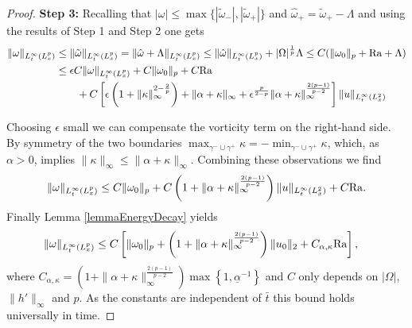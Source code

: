 \documentclass{article}
\theoremstyle{definition}
\theoremstyle{definition}
\newcommand{\Ra}{{\rm{Ra}}}
\begin{document}
\begin{proof}
\medskip
\textbf{Step 3:}
Recalling that $|\omega|\leq \max \lbrace |\tilde \omega_-|,|\tilde \omega_+|\rbrace$ and $\hat\omega_+ =\tilde \omega_+ - \Lambda$ and using the results of Step 1 and Step 2 one gets
\begin{align*}
        \|\omega\|_{L_t^\infty (L_x^p)} &\leq\|\tilde \omega\|_{L_t^\infty(L_x^p)} =\|\hat \omega+\Lambda\|_{L_t^\infty(L_x^p)}
        \leq  \|\hat\omega\|_{L_t^\infty(L_x^p)} + |\Omega|^\frac{1}{p} \Lambda
        \leq C(  \|\omega_0\|_p + \Ra +\Lambda)
        \\
        &\leq \epsilon C \|\omega\|_{L_t^\infty ( L_x^p)} + C\|\omega_0\|_p + C \Ra 
        \\
        &\qquad+ C\left[\epsilon\left(1+\|\kappa\|_\infty^{2-\frac{2}{p}}\right)+\|\alpha+\kappa\|_\infty+\epsilon^{\frac{p}{2-p}} \|\alpha+\kappa\|_\infty^{\frac{2(p-1)}{p-2}}\right] \|u\|_{L^\infty_t (L^2_x)}
\end{align*}
    
Choosing $\epsilon$ small we can compensate the vorticity term on the right-hand side. By symmetry of the two boundaries $\max_{\gamma^-\cup\gamma^+} \kappa=-\min_{\gamma^-\cup\gamma^+} \kappa$, which, as $\alpha>0$, implies $\|\kappa\|_\infty\leq \|\alpha+\kappa\|_\infty$. Combining these observations we find
\begin{align*}
    \|\omega\|_{L_t^\infty(L_x^p)} \leq C \|\omega_0\|_p + C\left(1+\|\alpha+\kappa\|_\infty^{\frac{2(p-1)}{p-2}}\right)\|u\|_{L_t^\infty(L_x^2)} + C\Ra.
\end{align*}
Finally Lemma \ref{lemmaEnergyDecay} yields
\begin{align*}
    \|\omega\|_{L_t^\infty(L_x^p)} 
    &\leq C \left[ \|\omega_0\|_p + \left(1+\|\alpha+\kappa\|_\infty^{\frac{2(p-1)}{p-2}}\right)\|u_0\|_{2}+ C_{\alpha,\kappa}\Ra\right],
\end{align*}
where $C_{\alpha,\kappa}=  \left(1+\|\alpha+\kappa\|_\infty^{\frac{2(p-1)}{p-2}}\right)\max\left\lbrace 1, \underline{\alpha}^{-1}\right\rbrace $ and $C$ only depends on $|\Omega|$, $\|h'\|_{\infty}$ and $p$. As the constants are independent of $\bar t$ this bound holds universally in time.


\end{proof}
\end{document}
